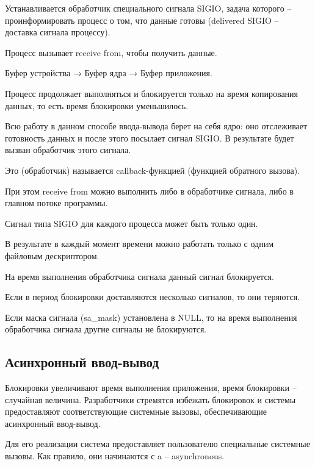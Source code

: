 Устанавливается обработчик специального сигнала SIGIO, задача которого – проинформировать процесс о том, что данные готовы (delivered SIGIO – доставка сигнала процессу).

Процесс вызывает receive from, чтобы получить данные.

Буфер устройства → Буфер ядра → Буфер приложения.

Процесс продолжает выполняться и блокируется только на время копирования данных, то есть время блокировки уменьшилось.

Всю работу в данном способе ввода-вывода берет на себя ядро: оно отслеживает готовность данных и после этого посылает сигнал SIGIO. В результате будет вызван обработчик этого сигнала.

Это (обработчик) называется callback-функцией (функцией обратного вызова).

При этом receive from можно выполнить либо в обработчике сигнала, либо в главном потоке программы.

Сигнал типа SIGIO для каждого процесса может быть только один.

В результате в каждый момент времени можно работать только с одним файловым дескриптором.

На время выполнения обработчика сигнала данный сигнал блокируется.

Если в период блокировки доставляются несколько сигналов, то они теряются.

Если маска сигнала (sa\_mask) установлена в NULL, то на время выполнения обработчика сигнала другие сигналы не блокируются.

\subsection{Асинхронный ввод-вывод}

Блокировки увеличивают время выполнения приложения, время блокировки – случайная величина. Разработчики стремятся избежать блокировок и системы предоставляют соответствующие системные вызовы, обеспечивающие асинхронный ввод-вывод. 

Для его реализации система предоставляет пользователю специальные системные вызовы. Как правило, они начинаются с a – asynchronous.

